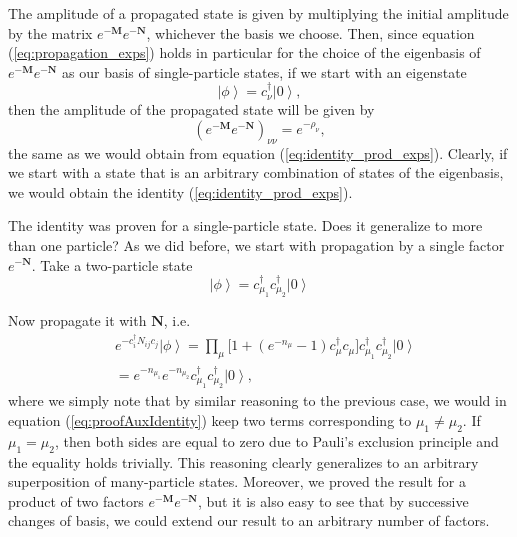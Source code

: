 The amplitude of a propagated state is given by multiplying the initial amplitude by the matrix $e^{-\bm M} e^{-\bm N}$, whichever the basis we choose. Then, since equation (\ref{eq:propagation_exps}) holds in particular for the choice of the eigenbasis of $e^{-\bm M}e^{-\bm N}$ as our basis of single-particle states, if we start with an eigenstate
\begin{equation}
\left| \phi \right\rangle = c_\nu^\dagger \left| 0 \right\rangle ,
\end{equation}
then the amplitude of the propagated state will be given by
\begin{equation}
(e^{-\bm M} e^{-\bm N} )_{\nu\nu} = e^{-\rho_\nu} ,
\end{equation}
the same as we would obtain from equation (\ref{eq:identity_prod_exps}). Clearly, if we start with a state that is an arbitrary combination of states of the eigenbasis, we would obtain the identity (\ref{eq:identity_prod_exps}).

The identity was proven for a single-particle state. Does it generalize to more than one particle? As we did before, we start with propagation by a single factor $e^{-\bm N}$. Take a two-particle state
\begin{equation}
\left| \phi \right\rangle = c_{\mu_1}^\dagger c_{\mu_2}^\dagger \left| 0 \right\rangle
\end{equation}

Now propagate it with $\bm N$, i.e. 
\begin{equation}
\begin{split}
&e^{-c_i^\dagger N_{ij} c_j} \left| \phi \right\rangle = \prod_\mu \bigg[ 1 + (e^{-n_\mu} -1 ) c_\mu^\dagger c_\mu \bigg] c_{\mu_1}^\dagger c_{\mu_2}^\dagger \left| 0 \right\rangle \\
&= e^{-n_{\mu_1}} e^{-n_{\mu_2}} c_{\mu_1}^\dagger c_{\mu_2}^\dagger \left| 0 \right\rangle ,
\end{split}
\end{equation}
where we simply note that by similar reasoning to the previous case, we would in equation (\ref{eq:proofAuxIdentity}) keep two terms corresponding to $\mu_1 \neq \mu_2$. If $\mu_1 = \mu_2$, then both sides are equal to zero due to Pauli's exclusion principle and the equality holds trivially. This reasoning clearly generalizes to an arbitrary superposition of many-particle states. Moreover, we proved the result for a product of two factors $e^{-\bm M} e^{-\bm N}$, but it is also easy to see that by successive changes of basis, we could extend our result to an arbitrary number of factors.

